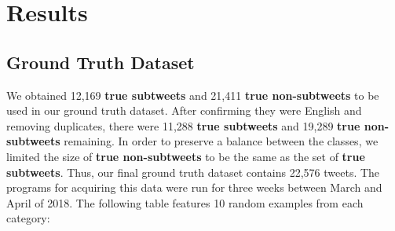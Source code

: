 \documentclass[11pt, twoside, reqno]{book}
\begin{document}
\chapter{Results}
\label{results}

\section{Ground Truth Dataset}
\label{ground_truth_dataset}

We obtained 12,169 \textbf{true subtweets} and 21,411 \textbf{true non-subtweets} to be used in our ground truth dataset. After confirming they were English and removing duplicates, there were 11,288 \textbf{true subtweets} and 19,289 \textbf{true non-subtweets} remaining. In order to preserve a balance between the classes, we limited the size of \textbf{true non-subtweets} to be the same as the set of \textbf{true subtweets}. Thus, our final ground truth dataset contains 22,576 tweets. The programs for acquiring this data were run for three weeks between March and April of 2018. The following table features 10 random examples from each category:
\pagebreak
\end{document}
